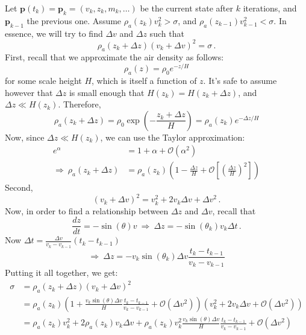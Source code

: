 Let $\pmb{p}(t_k) = \pmb{p}_k = (v_k, z_k, m_k, \dots)$ be the current state after $k$ iterations, and $\pmb{p}_{k-1}$ the previous one. Assume $\rho_a(z_k)v_k^2 > \sigma$, and $\rho_a(z_{k-1})v_{k-1}^2 < \sigma$. In essence, we will try to find $\Delta v$ and $\Delta z$ such that
\begin{equation*}
    \rho_a(z_k + \Delta z)\left(v_k + \Delta v\right)^2 = \sigma\,.
\end{equation*}
First, recall that we approximate the air density as follows:
\begin{equation*}
    \rho_a(z) = \rho_0 e^{-z/H}
\end{equation*}
for some scale height $H$, which is itself a function of $z$. It's safe to assume however that $\Delta z$ is small enough that $H(z_k) = H(z_k + \Delta z)$, and $\Delta z \ll H(z_k)$. Therefore,
\begin{equation*}
    \rho_a(z_k + \Delta z) = \rho_0 \exp\left(-\frac{z_k+\Delta z}{H}\right) = \rho_a(z_k)e^{-\Delta z / H}
\end{equation*}
Now, since $\Delta z \ll H(z_k)$, we can use the Taylor approximation:
\begin{align*}
    e^\alpha &= 1 + \alpha + \mathcal{O}(\alpha^2) \\
    \Rightarrow\ \rho_a(z_k + \Delta z) &= \rho_a(z_k)\left(1 - \frac{\Delta z}{H} + \mathcal{O}\left[\left(\frac{\Delta z}{H}\right)^2\right]\right)
\end{align*}
Second,
\begin{equation*}
    (v_k + \Delta v)^2 = v_k^2 + 2v_k\Delta v + \Delta v^2\,.
\end{equation*}
Now, in order to find a relationship between $\Delta z$ and $\Delta v$, recall that
\begin{equation*}
     \frac{dz}{dt} = -\sin(\theta) v\ \Rightarrow\ \Delta z = -\sin(\theta_k) v_k\Delta t\,.
\end{equation*}
Now $\Delta t= \frac{\Delta v}{v_k - v_{k-1}}(t_k - t_{k-1})$
\begin{equation*}
    \Rightarrow\ \Delta z = -v_k\sin(\theta_k)\Delta v\frac{t_k - t_{k-1}}{v_k - v_{k-1}}
\end{equation*}
Putting it all together, we get:
\begin{align*}
    \sigma &= \rho_a(z_k + \Delta z)\left(v_k + \Delta v\right)^2 \\
    &= \rho_a(z_k)\left(1 + \frac{v_k\sin(\theta)\Delta v}{H}\frac{t_k - t_{k-1}}{v_k - v_{k-1}} + \mathcal{O}(\Delta v^2)\right)(v_k^2 + 2v_k\Delta v + \mathcal{O}(\Delta v^2)) \\
    &= \rho_a(z_k)v_k^2 + 2\rho_a(z_k)v_k\Delta v + \rho_a(z_k)v_k^2 \frac{v_k\sin(\theta)\Delta v}{H}\frac{t_k - t_{k-1}}{v_k - v_{k-1}} + \mathcal{O}(\Delta v^2)
\end{align*}
